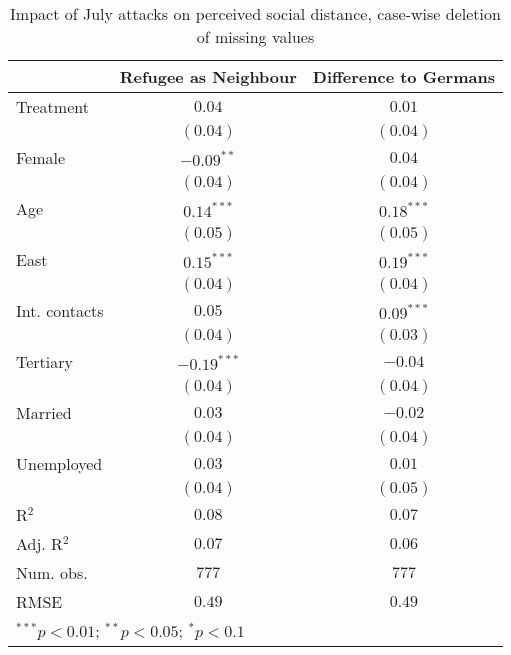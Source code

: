 
\begin{table}
\caption{Impact of July attacks on perceived social distance, case-wise deletion of missing values}
\begin{center}
\begin{tabular}{l c c}
\toprule
 & Refugee as Neighbour & Difference to Germans \\
\midrule
Treatment     & $0.04$        & $0.01$       \\
              & $(0.04)$      & $(0.04)$     \\
Female        & $-0.09^{**}$  & $0.04$       \\
              & $(0.04)$      & $(0.04)$     \\
Age           & $0.14^{***}$  & $0.18^{***}$ \\
              & $(0.05)$      & $(0.05)$     \\
East          & $0.15^{***}$  & $0.19^{***}$ \\
              & $(0.04)$      & $(0.04)$     \\
Int. contacts & $0.05$        & $0.09^{***}$ \\
              & $(0.04)$      & $(0.03)$     \\
Tertiary      & $-0.19^{***}$ & $-0.04$      \\
              & $(0.04)$      & $(0.04)$     \\
Married       & $0.03$        & $-0.02$      \\
              & $(0.04)$      & $(0.04)$     \\
Unemployed    & $0.03$        & $0.01$       \\
              & $(0.04)$      & $(0.05)$     \\
\midrule
R$^2$         & $0.08$        & $0.07$       \\
Adj. R$^2$    & $0.07$        & $0.06$       \\
Num. obs.     & $777$         & $777$        \\
RMSE          & $0.49$        & $0.49$       \\
\bottomrule
\multicolumn{3}{l}{\scriptsize{$^{***}p<0.01$; $^{**}p<0.05$; $^{*}p<0.1$}}
\end{tabular}
\label{tab_dist_na}
\end{center}
\end{table}
